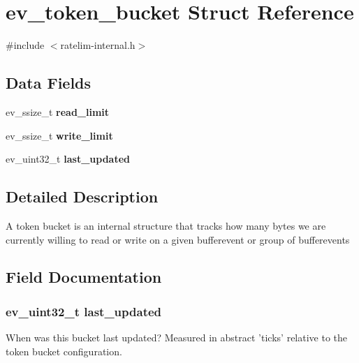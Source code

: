 \section{ev\-\_\-token\-\_\-bucket \-Struct \-Reference}
\label{structev__token__bucket}


{\ttfamily \#include $<$ratelim-\/internal.\-h$>$}

\subsection*{\-Data \-Fields}
\begin{DoxyCompactItemize}
\item 
ev\-\_\-ssize\-\_\-t {\bf read\-\_\-limit}
\item 
ev\-\_\-ssize\-\_\-t {\bfseries write\-\_\-limit}\label{structev__token__bucket_a392215ff577a4f5be274b4b2aa99b868}

\item 
ev\-\_\-uint32\-\_\-t {\bf last\-\_\-updated}
\end{DoxyCompactItemize}


\subsection{\-Detailed \-Description}
\-A token bucket is an internal structure that tracks how many bytes we are currently willing to read or write on a given bufferevent or group of bufferevents 

\subsection{\-Field \-Documentation}
\subsubsection[{last\-\_\-updated}]{\setlength{\rightskip}{0pt plus 5cm}ev\-\_\-uint32\-\_\-t {\bf last\-\_\-updated}}\label{structev__token__bucket_aad5d427c9a8cdf34a62170616a038870}
\-When was this bucket last updated? \-Measured in abstract 'ticks' relative to the token bucket configuration. 
